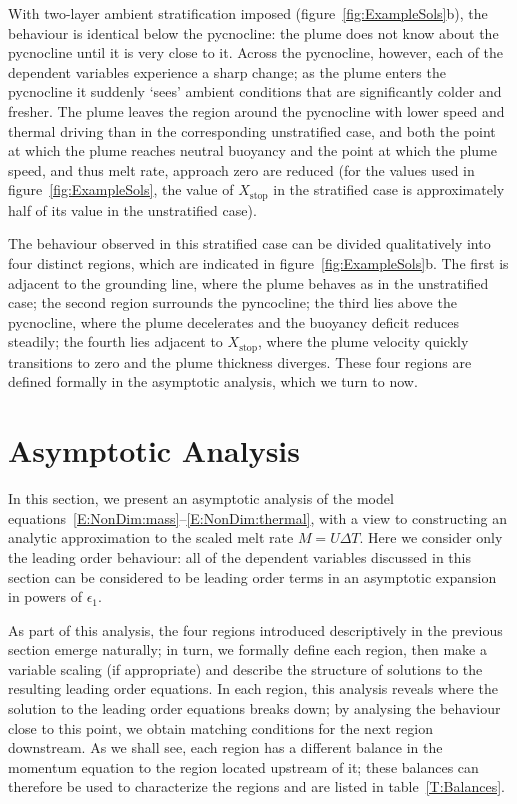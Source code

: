 \documentclass[openacc]{rsproca_new}%
\newcommand{\epsone}{\epsilon_{1}} %
\begin{document}
With two-layer ambient stratification imposed (figure~\ref{fig:ExampleSols}b), the behaviour is identical below the pycnocline: the plume does not know about the pycnocline until it is very close to it. Across the pycnocline, however, each of the dependent variables experience a sharp change; as the plume enters the pycnocline it suddenly `sees' ambient conditions that are significantly colder and fresher. The plume leaves the region around the pycnocline with lower speed and thermal driving than in the corresponding unstratified case, and both the point at which the plume reaches neutral buoyancy and the point at which the plume speed, and thus melt rate, approach zero are reduced (for the values used in figure~\ref{fig:ExampleSols}, the value of $X_{\text{stop}}$ in the stratified case is approximately half of its value in the unstratified case).

The behaviour observed in this stratified case can be divided qualitatively into four distinct regions, which are indicated in figure~\ref{fig:ExampleSols}b. The first is adjacent to the grounding line, where the plume behaves as in the unstratified case; the second region surrounds the pyncocline; the third lies above the pycnocline, where the plume decelerates and the buoyancy deficit reduces steadily; the fourth lies adjacent to $X_{\text{stop}}$, where the plume velocity quickly transitions to zero and the plume thickness diverges.  These four regions are defined formally in the asymptotic analysis, which we turn to now. 


\section{Asymptotic Analysis}\label{S:Asymptotics}
In this section, we present an asymptotic analysis of the model equations~\eqref{E:NonDim:mass}--\eqref{E:NonDim:thermal}, with a view to constructing an analytic approximation to the scaled melt rate $M = U \Delta T$. Here we consider only the leading order behaviour: all of the dependent variables discussed in this section can be considered to be leading order terms in an asymptotic expansion~\citep{HinchPerturbationMethods} in powers of $\epsone$. 

As part of this analysis, the four regions introduced descriptively in the previous section emerge naturally; in turn, we formally define each region, then make a variable scaling (if appropriate) and describe the structure of solutions to the resulting leading order equations. In each region, this analysis reveals where the solution to the leading order equations breaks down; by analysing the behaviour close to this point, we obtain matching conditions for the next region downstream. As we shall see, each region has a different balance in the momentum equation to the region located upstream of it; these balances can therefore be used to characterize the regions and are listed in table~\ref{T:Balances}. 
\end{document}

